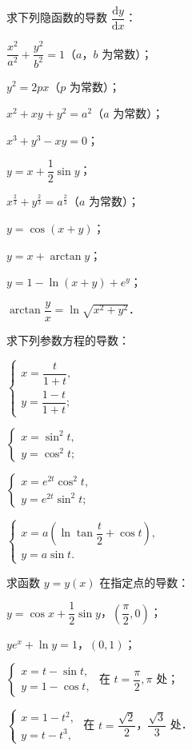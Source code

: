 \begin{xiti}
\item 求下列隐函数的导数 $\dfrac{\mathrm{d}y}{\mathrm{d}x}$：
\begin{ziti}
\item $\dfrac{x^{2}}{a^{2}}+\dfrac{y^{2}}{b^{2}}=1$（$a$，$b$ 为常数）；
\item $y^{2}=2px$（$p$ 为常数）；
\item $x^{2}+xy+y^{2}=a^{2}$（$a$ 为常数）；
\item $x^{3}+y^{3}-xy=0$；
\item $y=x+\dfrac{1}{2}\sin y$；
\item $x^{\frac{2}{3}}+y^{\frac{2}{3}}=a^{\frac{2}{3}}$（$a$ 为常数）；
\item $y=\cos(x+y)$；
\item $y=x+\arctan y$；
\item $y=1-\ln(x+y)+e^{y}$；
\item $\arctan\dfrac{y}{x}=\ln\sqrt{x^{2}+y^{2}}$．
\end{ziti}

\item 求下列参数方程的导数：
\begin{ziti}
\item $\begin{cases} x=\dfrac{t}{1+t},\\ y=\dfrac{1-t}{1+t};\end{cases}$
\item $\begin{cases} x=\sin^{2}t,\\ y=\cos^{2}t;\end{cases}$
\item $\begin{cases} x=e^{2t}\cos^{2}t,\\ y=e^{2t}\sin^{2}t;\end{cases}$
\item $\begin{cases} x=a\left(\ln\tan\dfrac{t}{2}+\cos t\right),\\ y=a\sin t.\end{cases}$
\end{ziti}

\item 求函数 $y=y(x)$ 在指定点的导数：
\begin{ziti}
\item $y=\cos x+\dfrac{1}{2}\sin y$，$\left(\dfrac{\pi}{2},0\right)$；
\item $ye^{x}+\ln y=1$，$(0,1)$；
\item $\begin{cases} x=t-\sin t,\\ y=1-\cos t,\end{cases}$ 在 $t=\dfrac{\pi}{2},\pi$ 处；
\item $\begin{cases} x=1-t^{2},\\ y=t-t^{3},\end{cases}$ 在 $t=\dfrac{\sqrt{2}}{2}$，$\dfrac{\sqrt{3}}{3}$ 处．
\end{ziti}


\end{xiti}
